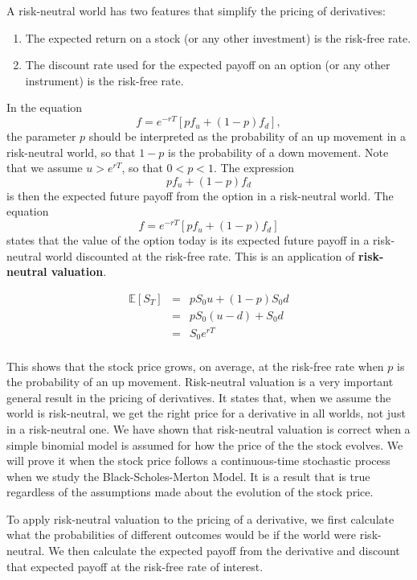 \documentclass[letterpaper,10pt]{article}
\begin{document}
A risk-neutral world has two features that simplify the pricing of derivatives:

\begin{enumerate}
\item The expected return on a stock (or any other investment) is the risk-free rate.
\item The discount rate used for the expected payoff on an option (or any other instrument) is the risk-free rate.

\end{enumerate}

\noindent In the equation $$f=e^{-rT}\left[pf_u+(1-p)f_d\right],$$ the parameter $p$ should be interpreted as the probability of an up movement in a risk-neutral world, so that $1-p$ is the probability of a down movement.  Note that we assume $u>e^{rT}$, so that $0<p<1$.  The expression $$pf_u+(1-p)f_d$$ is then the expected future payoff from the option in a risk-neutral world.  The equation $$f=e^{-rT}\left[pf_u+(1-p)f_d\right]$$ states that the value of the option today is its expected future payoff in a risk-neutral world discounted at the risk-free rate.  This is an application of {\bf risk-neutral valuation}.  

\begin{eqnarray*}
\mathbb{E}[S_T]&=&pS_0u+(1-p)S_0d\\
&=&pS_0(u-d)+S_0d\\
&=&S_0e^{rT}\\
\end{eqnarray*}

\noindent This shows that the stock price grows, on average, at the risk-free rate when $p$ is the probability of an up movement.  Risk-neutral valuation is a very important general result in the pricing of derivatives. It states that, when we assume the world is risk-neutral, we get the right price for a derivative in all worlds, not just in a risk-neutral one. We have shown that risk-neutral valuation is correct when a simple binomial model is assumed for how the price of the the stock evolves. We will prove it when the stock price follows a continuous-time stochastic process when we study the Black-Scholes-Merton Model. It is a result that is true regardless of the assumptions made about the evolution of the stock price.

\noindent To apply risk-neutral valuation to the pricing of a derivative, we first calculate what the probabilities of different outcomes would be if the world were risk-neutral. We then calculate the expected payoff from the derivative and discount that expected payoff at the risk-free rate of interest.
\end{document}
